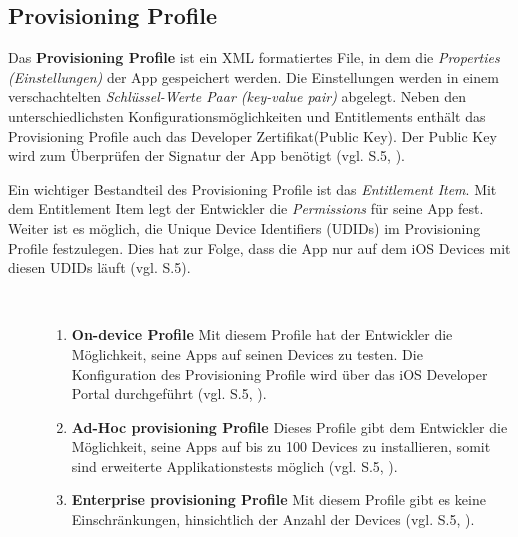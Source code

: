\subsection{Provisioning Profile}
\label{sec:ProvisioningProfile}
Das \textbf{Provisioning Profile} ist ein XML formatiertes File, in dem die \textit{\glqq Properties (Einstellungen)\grqq{}} der App gespeichert werden. Die Einstellungen werden in einem verschachtelten \textit{\glqq Schlüssel-Werte Paar (key-value pair)\grqq{}} abgelegt. Neben den unterschiedlichsten Konfigurationsmöglichkeiten und Entitlements enthält das Provisioning Profile auch das Developer Zertifikat(Public Key). Der Public Key wird zum Überprüfen der Signatur der App benötigt (vgl. \cite{iOSSec[5]} S.5, \cite{Hacking[1], ProvisioningProfile[1], ProvisioningProfile[2]}). \par
Ein wichtiger Bestandteil des Provisioning Profile ist das \textit{\glqq Entitlement Item\grqq{}}. Mit dem Entitlement Item legt der Entwickler die \textit{\glqq Permissions\grqq{}} für seine App fest. Weiter ist es möglich, die Unique Device Identifiers (UDIDs) im Provisioning Profile festzulegen. Dies hat zur Folge, dass die App nur auf dem iOS Devices mit diesen UDIDs läuft (vgl. \cite{iOSSec[5]} S.5). \par 
\newpage

\begin{description}
    \item[\parbox{\textwidth} {Es gibt drei unterschiedliche Arten von Provisioning Profiles }]~\par
    \begin{enumerate}
        \item \textbf{On-device Profile} \newline
Mit diesem Profile hat der Entwickler die Möglichkeit, seine Apps auf seinen Devices zu testen. Die Konfiguration des Provisioning Profile wird über das iOS Developer Portal durchgeführt (vgl. \cite{iOSSec[5]} S.5, \cite{AppDist[1]}).
        \item \textbf{Ad-Hoc provisioning Profile} \newline
Dieses Profile gibt dem Entwickler die Möglichkeit, seine Apps auf bis zu 100 Devices zu installieren, somit sind erweiterte Applikationstests möglich (vgl. \cite{iOSSec[5]} S.5, \cite{AppDist[1]}).
    
        \item \textbf{Enterprise provisioning Profile} \newline
Mit diesem Profile gibt es keine Einschränkungen, hinsichtlich der Anzahl der Devices (vgl. \cite{iOSSec[5]} S.5, \cite{AppDist[1]}).
    \end{enumerate}
\end{description} 


